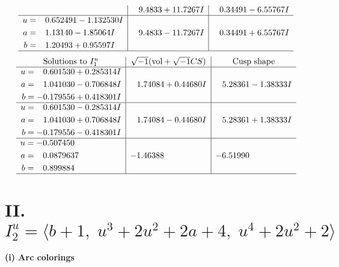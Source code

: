 \documentclass[1p]{elsarticle_modified}
\theoremstyle{definition}
\newcommand{\I}{\sqrt{-1}}
\begin{document}
$$\begin{array}{c|c|c}
 & \phantom{-}9.4833 + 11.7267 I & \phantom{-}0.34491 - 6.55767 I \\ \hline\begin{aligned}
u &= \phantom{-}0.652491 - 1.132530 I \\
a &= \phantom{-}1.13140 - 1.85064 I \\
b &= \phantom{-}1.20493 + 0.95597 I\end{aligned}
 & \phantom{-}9.4833 - 11.7267 I & \phantom{-}0.34491 + 6.55767 I\\
 \hline 
 \end{array}$$\newpage$$\begin{array}{c|c|c}  
\text{Solutions to }I^u_{1}& \I (\text{vol} + \sqrt{-1}CS) & \text{Cusp shape}\\
 \hline 
\begin{aligned}
u &= \phantom{-}0.601530 + 0.285314 I \\
a &= \phantom{-}1.041030 - 0.706848 I \\
b &= -0.179556 + 0.418301 I\end{aligned}
 & \phantom{-}1.74084 + 0.44680 I & \phantom{-}5.28361 - 1.38333 I \\ \hline\begin{aligned}
u &= \phantom{-}0.601530 - 0.285314 I \\
a &= \phantom{-}1.041030 + 0.706848 I \\
b &= -0.179556 - 0.418301 I\end{aligned}
 & \phantom{-}1.74084 - 0.44680 I & \phantom{-}5.28361 + 1.38333 I \\ \hline\begin{aligned}
u &= -0.507450\phantom{ +0.000000I} \\
a &= \phantom{-}0.0879637\phantom{ +0.000000I} \\
b &= \phantom{-}0.899884\phantom{ +0.000000I}\end{aligned}
 & -1.46388\phantom{ +0.000000I} & -6.51990\phantom{ +0.000000I}\\
 \hline 
 \end{array}$$\newpage\newpage\renewcommand{\arraystretch}{1}
\centering \section*{II. $I^u_{2}= \langle b+1,\;u^3+2 u^2+2 a+4,\;u^4+2 u^2+2 \rangle$}
\flushleft \textbf{(i) Arc colorings}\\
\end{document}
